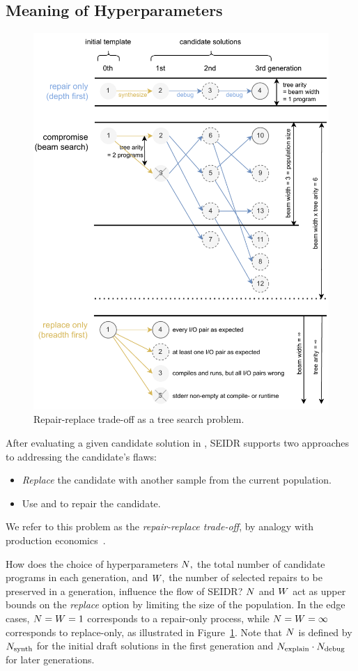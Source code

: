 \newpage \subsection{Meaning of Hyperparameters}
\label{sec:seidr-beam-search}
\begin{figure}[H]
    \centering
    \includegraphics[width=0.8\linewidth, trim={0mm 4mm 0mm 0mm}]{images/beamsearch.pdf}
    \caption{Repair-replace trade-off as a tree search problem.}
    \label{fig:beam-search}
\end{figure}

After evaluating a given candidate solution in \execute{}, SEIDR supports two approaches to addressing the candidate's flaws:
\begin{itemize}
\setlength{\parskip}{0pt}
\setlength\itemsep{0pt}
  \item \emph{Replace} the candidate with another sample from the current population.
  \item Use \instruct{} and \debug{} to repair the candidate.
\end{itemize}
We refer to this problem as the \emph{repair-replace trade-off}, by analogy with production economics~\cite{jack2000:optimal}. 

How does the choice of hyperparameters $N{},$ the total number of candidate programs in each generation, and $W{},$ the number of selected repairs to be preserved in a generation, influence the flow of SEIDR?
$N$ and $W{}$ act as upper bounds on the \emph{replace} option by limiting the size of the population.
In the edge cases, $N{} = W{} = 1$ corresponds to a repair-only process, while $N{} = W{} = \infty$ corresponds to replace-only, as illustrated in Figure~\ref{fig:beam-search}. 
Note that $N{}$ is defined by $N_\text{synth}{}$ for the initial draft solutions in the first generation and $N_\text{explain}{} \cdot N_\text{debug}{}$ for later generations. 

